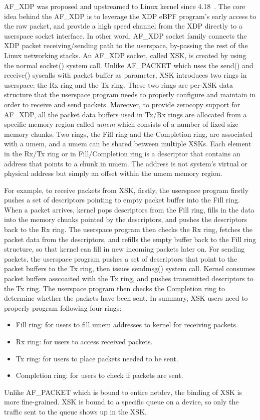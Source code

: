 \documentclass[10pt,numbers,reprint]{sigplanconf}
\begin{document}
AF\_XDP was proposed and upstreamed to Linux kernel since 4.18~\cite{af_xdp_lwn}.
The core idea behind the AF\_XDP is to leverage the XDP eBPF program's
early access to the raw packet, and provide a high speed channel from the XDP
directly to a userspace socket interface. In other word, AF\_XDP socket family
connects the XDP packet receiving/sending path to the userspace, by-passing the
rest of the Linux networking stacks.
An AF\_XDP socket, called XSK, is created by using the normal socket() system
call. Unlike AF\_PACKET which uses the send() and receive() syscalls with packet
buffer as parameter, XSK introduces two rings in userspace: the Rx ring and the
Tx ring. These two rings are per-XSK data structure that the userspace program
needs to properly configure and maintain in order to receive and send packets.
Moreover, to provide zerocopy support for AF\_XDP, all the packet data buffers
used in Tx/Rx rings are allocated from a specific memory region called {\em umem}
which consists of a number of fixed size memory chunks.
Two rings, the Fill ring and the Completion ring, are associated with a umem,
and a umem can be shared between multiple XSKs.
Each element in the Rx/Tx ring or in Fill/Completion ring is a descriptor that
contains an address that points to a chunk in umem. The address is not system's
virtual or physical address but simply an offset within the umem memory
region.

For example, to receive packets from XSK, firstly, the userspace program firstly
pushes a set of descriptors pointing to empty packet buffer into the Fill ring.
When a packet
arrives, kernel pops descriptors from the Fill ring, fills in the data into the
memory chunks pointed by the descriptors, and pushes the descriptors back to
the Rx ring.
The userspace program then checks the Rx ring, fetches the packet data from the
descriptors, and refills the empty buffer back to the Fill ring structure, so
that kernel can fill in new incoming packets later on.
For sending packets, the userspace program pushes a set of descriptors that
point to the packet buffers to the Tx ring, then issues sendmsg() system call.
Kernel consumes packet buffers asscoaited with the Tx ring, and pushes
transmitted descriptors to the Tx ring.
The userspace program then checks the Completion ring to determine whether the
packets have been sent.
In summary, XSK users need to properly program following four rings:
\begin{itemize}
\item Fill ring: for users to fill umem addresses to kernel for receiving packets.
\item Rx ring: for users to access received packets.
\item Tx ring: for users to place packets needed to be sent.
\item Completion ring: for users to check if packets are sent.
\end{itemize}
Unlike AF\_PACKET which is bound to entire netdev, the binding of XSK is more
fine-grained. XSK is bound to a specific queue on a device, so only the
traffic sent to the queue shows up in the XSK.
\end{document}
